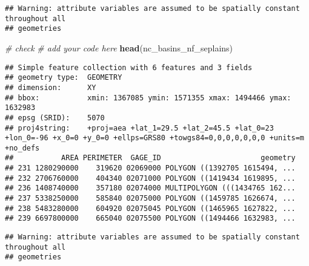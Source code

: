 \documentclass[]{article}
\newenvironment{Shaded}{\begin{snugshade}}{\end{snugshade}}
\newcommand{\KeywordTok}[1]{\textcolor[rgb]{0.13,0.29,0.53}{\textbf{#1}}}
\newcommand{\StringTok}[1]{\textcolor[rgb]{0.31,0.60,0.02}{#1}}
\newcommand{\CommentTok}[1]{\textcolor[rgb]{0.56,0.35,0.01}{\textit{#1}}}
\newcommand{\OperatorTok}[1]{\textcolor[rgb]{0.81,0.36,0.00}{\textbf{#1}}}
\newcommand{\NormalTok}[1]{#1}
\begin{document}
\begin{verbatim}
## Warning: attribute variables are assumed to be spatially constant throughout all
## geometries
\end{verbatim}

\begin{Shaded}
\begin{Highlighting}[]
\CommentTok{# check}
\CommentTok{# add your code here}
\KeywordTok{head}\NormalTok{(nc_basins_nf_seplains)}
\end{Highlighting}
\end{Shaded}

\begin{verbatim}
## Simple feature collection with 6 features and 3 fields
## geometry type:  GEOMETRY
## dimension:      XY
## bbox:           xmin: 1367085 ymin: 1571355 xmax: 1494466 ymax: 1632983
## epsg (SRID):    5070
## proj4string:    +proj=aea +lat_1=29.5 +lat_2=45.5 +lat_0=23 +lon_0=-96 +x_0=0 +y_0=0 +ellps=GRS80 +towgs84=0,0,0,0,0,0,0 +units=m +no_defs
##           AREA PERIMETER  GAGE_ID                       geometry
## 231 1280290000    319620 02069000 POLYGON ((1392705 1615494, ...
## 232 2706760000    404340 02071000 POLYGON ((1419434 1619895, ...
## 236 1408740000    357180 02074000 MULTIPOLYGON (((1434765 162...
## 237 5338250000    585840 02075000 POLYGON ((1459785 1626674, ...
## 238 5483280000    604920 02075045 POLYGON ((1465965 1627822, ...
## 239 6697800000    665040 02075500 POLYGON ((1494466 1632983, ...
\end{verbatim}

\begin{Shaded}
\end{Shaded}

\begin{verbatim}
## Warning: attribute variables are assumed to be spatially constant throughout all
## geometries
\end{verbatim}

\begin{Shaded}
\end{Shaded}
\end{document}

